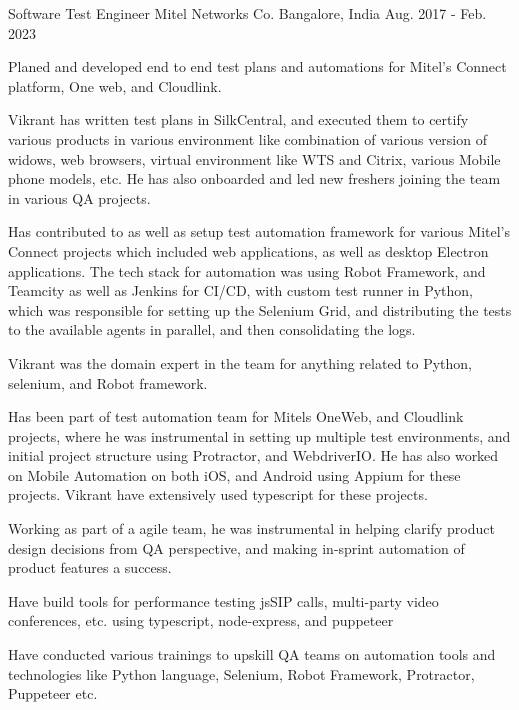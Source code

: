 

\begin{cventries}

  \cventry
    {Software Test Engineer} %
    {Mitel Networks Co.} %
    {Bangalore, India} %
    {Aug. 2017 - Feb. 2023} %
    {
      \begin{cvitems} %
        \item { Planed and developed end to end test plans and automations for Mitel's Connect platform, One web, and Cloudlink. }
        \item { Vikrant has written test plans in SilkCentral, and executed them to certify various products in various environment like combination of various version of widows, web browsers, virtual environment like WTS and Citrix, various Mobile phone models, etc. He has also onboarded and led new freshers joining the team in various QA projects. }
        \item { Has contributed to as well as setup test automation framework for various Mitel's Connect projects which included web applications, as well as desktop Electron applications. The tech stack for automation was using Robot Framework, and Teamcity as well as Jenkins for CI/CD, with custom test runner in Python, which was responsible for setting up the Selenium Grid, and distributing the tests to the available agents in parallel, and then consolidating the logs. }
        \item { Vikrant was the domain expert in the team for anything related to Python, selenium, and Robot framework. }
        \item { Has been part of test automation team for Mitels OneWeb, and Cloudlink projects, where he was instrumental in setting up multiple test environments, and initial project structure using Protractor, and WebdriverIO. He has also worked on Mobile Automation on both iOS, and Android using Appium for these projects. Vikrant have extensively used typescript for these projects.}
        \item { Working as part of a agile team, he was instrumental in helping clarify product design decisions from QA perspective, and making in-sprint automation of product features a success. }
        \item { Have build tools for performance testing jsSIP calls, multi-party video conferences, etc. using typescript, node-express, and puppeteer } 
        \item { Have conducted various trainings to upskill QA teams on automation tools and technologies like Python language, Selenium, Robot Framework, Protractor, Puppeteer etc. }     
      \end{cvitems}
    }


\end{cventries}
